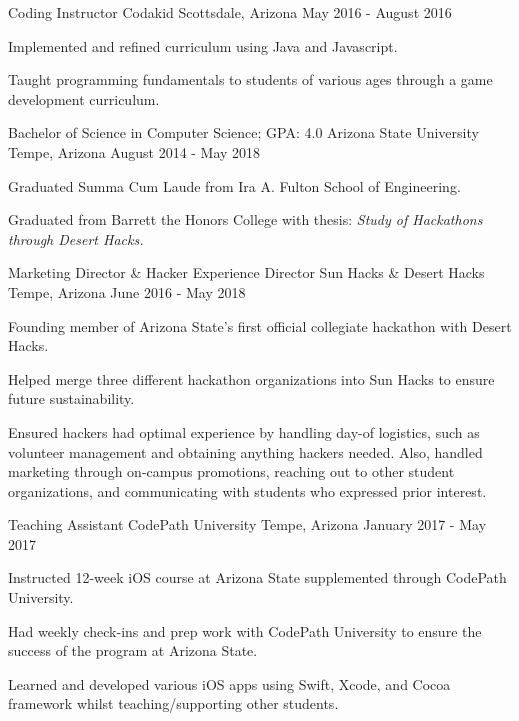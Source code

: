 \documentclass[
    changecolor={96, 52, 177},
]{peter-resume}
\begin{document}
\cventry
  {Coding Instructor}
  {Codakid}
  {Scottsdale, Arizona}
  {May 2016 - August 2016}
  {
    \begin{cvitems}
      \item {Implemented and refined curriculum using Java and Javascript.}
      \item {Taught programming fundamentals to students of various ages through a game development curriculum.}
    \end{cvitems}
  }

\cventry
  {Bachelor of Science in Computer Science; GPA: 4.0}
  {Arizona State University}
  {Tempe, Arizona}
  {August 2014 - May 2018}
  {
    \begin{cvitems}
      \item {Graduated Summa Cum Laude from Ira A. Fulton School of Engineering.}
      \item {Graduated from Barrett the Honors College with thesis: \it{Study of Hackathons through Desert Hacks}.}
    \end{cvitems}
  }

\cventry
  {Marketing Director \& Hacker Experience Director}
  {Sun Hacks \& Desert Hacks}
  {Tempe, Arizona}
  {June 2016 - May 2018}
  {
    \begin{cvitems}
      \item {Founding member of Arizona State's first official collegiate hackathon with Desert Hacks.}
      \item {Helped merge three different hackathon organizations into Sun Hacks to ensure future sustainability.}
      \item {Ensured hackers had optimal experience by handling day-of logistics, such as volunteer management and obtaining anything hackers needed. Also, handled marketing through on-campus promotions, reaching out to other student organizations, and communicating with students who expressed prior interest.}
    \end{cvitems}
  }
\cventry
  {Teaching Assistant}
  {CodePath University}
  {Tempe, Arizona}
  {January 2017 - May 2017}
  {
    \begin{cvitems}
      \item {Instructed 12-week iOS course at Arizona State supplemented through CodePath University.}
      \item {Had weekly check-ins and prep work with CodePath University to ensure the success of the program at Arizona State.}
      \item {Learned and developed various iOS apps using Swift, Xcode, and Cocoa framework whilst teaching/supporting other students.}
    \end{cvitems}
  }

  \begin{cvskills}
  \end{cvskills}
\end{document}
